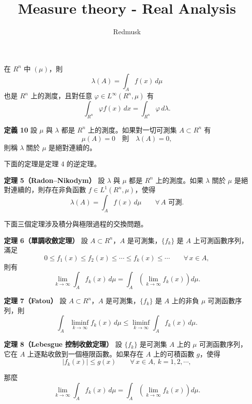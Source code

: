 \documentclass[11pt,a4paper,twoside]{article}
\title{Measure theory - Real Analysis}
\author{Redmusk}
\date{}
\begin{document}
\maketitle

\setcounter{page}{317}


在 $R^n$ 中 $(\mu)$，則
\[
    \lambda(A)=\int_A f(x)\,d\mu
\]
也是 $R^n$ 上的測度，且對任意 $\varphi\in L^\infty(R^n,\mu)$ 有
\[
    \int_{R^n}\varphi f(x)\,dx=\int_{R^n}\varphi\,d\lambda .
\]

\noindent\textbf{定義 10}\quad
設 $\mu$ 與 $\lambda$ 都是 $R^n$ 上的測度。如果對一切可測集
$A\subset R^n$ 有
\[
    \mu(A)=0\quad\text{則}\quad \lambda(A)=0,
\]
則稱 $\lambda$ 關於 $\mu$ 是絕對連續的。

下面的定理是定理 4 的逆定理。

\noindent\textbf{定理 5（Radon--Nikodym）}\quad
設 $\lambda$ 與 $\mu$ 都是 $R^n$ 上的測度。如果
$\lambda$ 關於 $\mu$ 是絕對連續的，則存在非負函數
$f\in L^1(R^n,\mu)$，使得
\[
    \lambda(A)=\int_A f(x)\,d\mu
    \qquad \forall\, A\text{ 可測}.
\]

下面三個定理涉及積分與極限過程的交換問題。

\noindent\textbf{定理 6（單調收斂定理）}\quad
設 $A\subset R^n$，$A$ 是可測集，$\{f_k\}$ 是 $A$ 上可測函數序列，
滿足
\[
    0\le f_1(x)\le f_2(x)\le\cdots\le f_k(x)\le\cdots
    \qquad \forall\,x\in A,
\]
則有
\[
    \lim_{k\to\infty}\int_A f_k(x)\,d\mu
    =
    \int_A\left(\lim_{k\to\infty}f_k(x)\right)d\mu .
\]

\noindent\textbf{定理 7（Fatou）}\quad
設 $A\subset R^n$，$A$ 是可測集，$\{f_k\}$ 是 $A$ 上的非負 $\mu$
可測函數序列，則
\[
    \int_A \liminf_{k\to\infty}f_k(x)\,d\mu
    \le
    \liminf_{k\to\infty}\int_A f_k(x)\,d\mu .
\]

\noindent\textbf{定理 8（Lebesgue 控制收斂定理）}\quad
設 $\{f_k\}$ 是可測集 $A$ 上的 $\mu$ 可測函數序列，它在 $A$ 上逐點收斂到一個極限函數。如果存在 $A$ 上的可積函數 $g$，使得
\[
    |f_k(x)|\le g(x)
    \qquad \forall\,x\in A,\ k=1,2,\cdots,
\]

\newpage

那麼
\[
    \lim_{k\to\infty}\int_A f_k(x)\,d\mu
    =
    \int_A\left(\lim_{k\to\infty}f_k(x)\right)d\mu .
\]
\end{document}
